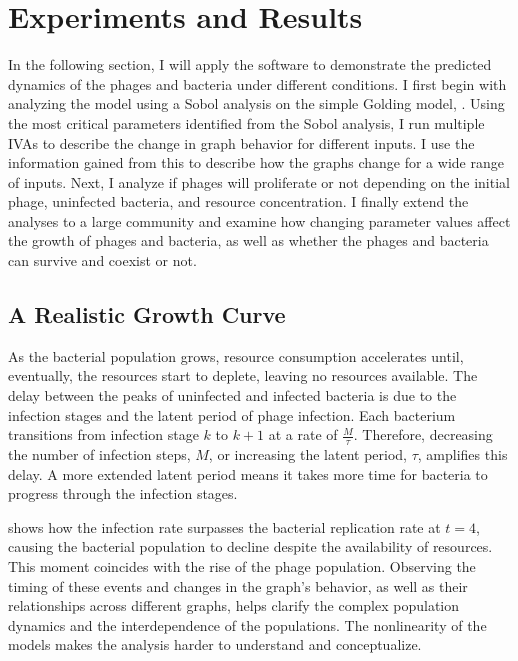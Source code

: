 \chapter{Experiments and Results}
\label{AER}

In the following section, I will apply the software to demonstrate the predicted dynamics of the phages and bacteria under different conditions. 
I first begin with analyzing the model using a Sobol analysis on the simple Golding model, . 
Using the most critical parameters identified from the Sobol analysis, I run multiple IVAs to describe the change in graph behavior for different inputs. 
I use the information gained from this to describe how the graphs change for a wide range of inputs. 
Next, I analyze if phages will proliferate or not depending on the initial phage, uninfected bacteria, and resource concentration. 
I finally extend the analyses to a large community and examine how changing parameter values affect the growth of phages and bacteria, as well as whether the phages and bacteria can survive and coexist or not. 

\section{A Realistic Growth Curve}
As the bacterial population grows, resource consumption accelerates until, eventually, the resources start to deplete, leaving no resources available. 
The delay between the peaks of uninfected and infected bacteria is due to the infection stages and the latent period of phage infection. 
Each bacterium transitions from infection stage $k$ to $k+1$ at a rate of $\frac{M}{\tau}$. 
Therefore, decreasing the number of infection steps, $M$, or increasing the latent period, $\tau$, amplifies this delay. 
A more extended latent period means it takes more time for bacteria to progress through the infection stages.

 shows how the infection rate surpasses the bacterial replication rate at $t=4$, causing the bacterial population to decline despite the availability of resources. 
This moment coincides with the rise of the phage population. 
Observing the timing of these events and changes in the graph’s behavior, as well as their relationships across different graphs, helps clarify the complex population dynamics and the interdependence of the populations. 
The nonlinearity of the models makes the analysis harder to understand and conceptualize. 

